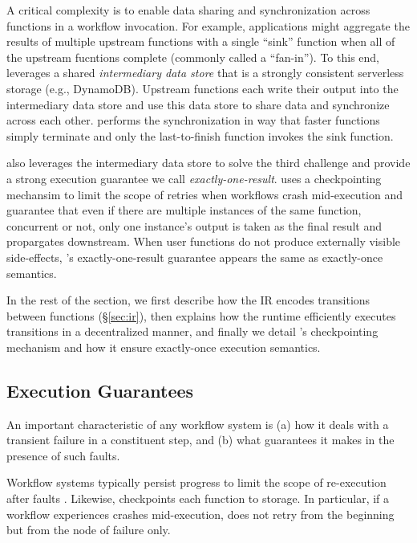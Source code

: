 A critical complexity is to enable data sharing and synchronization across
functions in a workflow invocation. For example, applications might aggregate
the results of multiple upstream functions with a single ``sink'' function
when all of the upstream fucntions complete (commonly called a ``fan-in''). To
this end, \name{} leverages a shared \emph{intermediary data store} that is a
strongly consistent serverless storage (e.g., DynamoDB). Upstream functions
each write their output into the intermediary data
store and use this data store to share data and  synchronize across each other. \name{} performs the synchronization in way that faster functions simply terminate and only the last-to-finish
function invokes the sink function. 

\name{} also leverages the intermediary data store to solve the third
challenge and provide a strong execution guarantee we call
\emph{exactly-one-result}. \name{} uses a checkpointing mechansim to limit the
scope of retries when workflows crash mid-execution and guarantee that even if
there are multiple instances of the same function, concurrent or not, only one
instance's output is taken as the final result and propargates downstream.
When user functions do not produce externally visible side-effects, \name{}'s
exactly-one-result guarantee appears the same as exactly-once semantics.

In the rest of the section, we first describe how the \name{} IR encodes
transitions between functions (\S\ref{sec:ir}), then explains how the \name{}
runtime efficiently executes transitions in a decentralized manner, and
finally we detail \name{}'s checkpointing mechanism and how it ensure
exactly-once execution semantics. 









\subsection{Execution Guarantees}\label{sec:exec-gntee}

An important characteristic of any workflow system is (a) how it deals with  a
transient failure in a constituent step, and (b) what guarantees it makes in
the presence of such faults.
 
Workflow systems typically persist progress to limit the scope of re-execution after faults
\cite{aws-step-functions, durable-functions, netherite, google-workflows, kappa}.
Likewise, \name{} checkpoints each function to storage.
 In particular, if a workflow experiences crashes mid-execution,
\name{} does not retry from the beginning but from the node of failure only.

